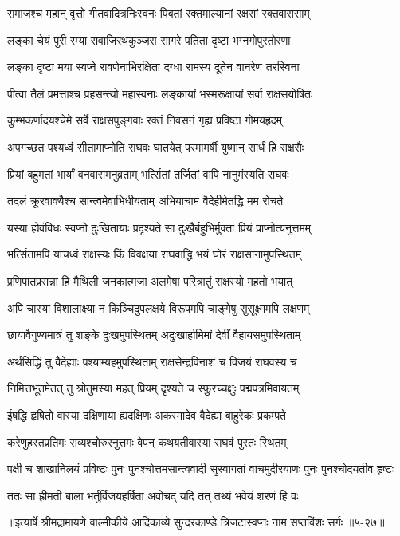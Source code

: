 \twolineshloka
{समाजश्च महान् वृत्तो गीतवादित्रनिःस्वनः}
{पिबतां रक्तमाल्यानां रक्षसां रक्तवाससाम्} %

\twolineshloka
{लङ्का चेयं पुरी रम्या सवाजिरथकुञ्जरा}
{सागरे पतिता दृष्टा भग्नगोपुरतोरणा} %

\twolineshloka
{लङ्का दृष्टा मया स्वप्ने रावणेनाभिरक्षिता}
{दग्धा रामस्य दूतेन वानरेण तरस्विना} %

\twolineshloka
{पीत्वा तैलं प्रमत्ताश्च प्रहसन्त्यो महास्वनाः}
{लङ्कायां भस्मरूक्षायां सर्वा राक्षसयोषितः} %

\twolineshloka
{कुम्भकर्णादयश्चेमे सर्वे राक्षसपुङ्गवाः}
{रक्तं निवसनं गृह्य प्रविष्टा गोमयह्रदम्} %

\twolineshloka
{अपगच्छत पश्यध्वं सीतामाप्नोति राघवः}
{घातयेत् परमामर्षी युष्मान् सार्धं हि राक्षसैः} %

\twolineshloka
{प्रियां बहुमतां भार्यां वनवासमनुव्रताम्}
{भर्त्सितां तर्जितां वापि नानुमंस्यति राघवः} %

\twolineshloka
{तदलं क्रूरवाक्यैश्च सान्त्वमेवाभिधीयताम्}
{अभियाचाम वैदेहीमेतद्धि मम रोचते} %

\twolineshloka
{यस्या ह्येवंविधः स्वप्नो दुःखितायाः प्रदृश्यते}
{सा दुःखैर्बहुभिर्मुक्ता प्रियं प्राप्नोत्यनुत्तमम्} %

\twolineshloka
{भर्त्सितामपि याचध्वं राक्षस्यः किं विवक्षया}
{राघवाद्धि भयं घोरं राक्षसानामुपस्थितम्} %

\twolineshloka
{प्रणिपातप्रसन्ना हि मैथिली जनकात्मजा}
{अलमेषा परित्रातुं राक्षस्यो महतो भयात्} %

\twolineshloka
{अपि चास्या विशालाक्ष्या न किञ्चिदुपलक्षये}
{विरूपमपि चाङ्गेषु सुसूक्ष्ममपि लक्षणम्} %

\twolineshloka
{छायावैगुण्यमात्रं तु शङ्के दुःखमुपस्थितम्}
{अदुःखार्हामिमां देवीं वैहायसमुपस्थिताम्} %

\twolineshloka
{अर्थसिद्धिं तु वैदेह्याः पश्याम्यहमुपस्थिताम्}
{राक्षसेन्द्रविनाशं च विजयं राघवस्य च} %

\twolineshloka
{निमित्तभूतमेतत् तु श्रोतुमस्या महत् प्रियम्}
{दृश्यते च स्फुरच्चक्षुः पद्मपत्रमिवायतम्} %

\twolineshloka
{ईषद्धि हृषितो वास्या दक्षिणाया ह्यदक्षिणः}
{अकस्मादेव वैदेह्या बाहुरेकः प्रकम्पते} %

\twolineshloka
{करेणुहस्तप्रतिमः सव्यश्चोरुरनुत्तमः}
{वेपन् कथयतीवास्या राघवं पुरतः स्थितम्} %

\twolineshloka
{पक्षी च शाखानिलयं प्रविष्टः पुनः पुनश्चोत्तमसान्त्ववादी}
{सुस्वागतां वाचमुदीरयाणः पुनः पुनश्चोदयतीव हृष्टः} %

\twolineshloka
{ततः सा ह्रीमती बाला भर्तुर्विजयहर्षिता}
{अवोचद् यदि तत् तथ्यं भवेयं शरणं हि वः} %


॥इत्यार्षे श्रीमद्रामायणे वाल्मीकीये आदिकाव्ये सुन्दरकाण्डे त्रिजटास्वप्नः नाम सप्तविंशः सर्गः ॥५-२७॥
